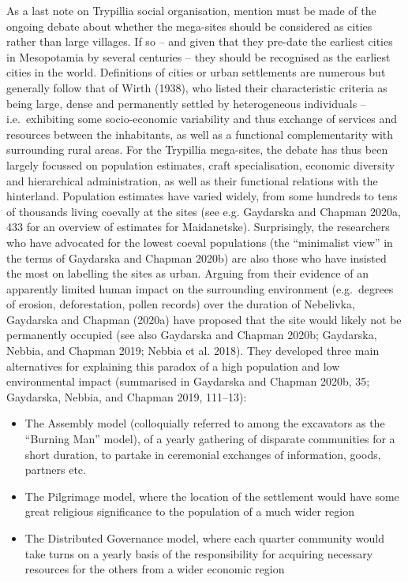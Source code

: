 \documentclass[
  12pt,
  a4paper, twoside]{book}
\providecommand{\tightlist}{%
  \setlength{\itemsep}{0pt}\setlength{\parskip}{0pt}}
\begin{document}
As a last note on Trypillia social organisation, mention must be made of the ongoing debate about whether the mega-sites should be considered as cities rather than large villages. If so -- and given that they pre-date the earliest cities in Mesopotamia by several centuries -- they should be recognised as the earliest cities in the world. Definitions of cities or urban settlements are numerous but generally follow that of Wirth (1938), who listed their characteristic criteria as being large, dense and permanently settled by heterogeneous individuals -- i.e.~exhibiting some socio-economic variability and thus exchange of services and resources between the inhabitants, as well as a functional complementarity with surrounding rural areas. For the Trypillia mega-sites, the debate has thus been largely focussed on population estimates, craft specialisation, economic diversity and hierarchical administration, as well as their functional relations with the hinterland. Population estimates have varied widely, from some hundreds to tens of thousands living coevally at the sites (see e.g. Gaydarska and Chapman 2020a, 433 for an overview of estimates for Maidanetske). Surprisingly, the researchers who have advocated for the lowest coeval populations (the ``minimalist view'' in the terms of Gaydarska and Chapman 2020b) are also those who have insisted the most on labelling the sites as urban. Arguing from their evidence of an apparently limited human impact on the surrounding environment (e.g.~degrees of erosion, deforestation, pollen records) over the duration of Nebelivka, Gaydarska and Chapman (2020a) have proposed that the site would likely not be permanently occupied (see also Gaydarska and Chapman 2020b; Gaydarska, Nebbia, and Chapman 2019; Nebbia et al. 2018). They developed three main alternatives for explaining this paradox of a high population and low environmental impact (summarised in Gaydarska and Chapman 2020b, 35; Gaydarska, Nebbia, and Chapman 2019, 111--13):

\begin{itemize}
\tightlist
\item
  The Assembly model (colloquially referred to among the excavators as the ``Burning Man'' model), of a yearly gathering of disparate communities for a short duration, to partake in ceremonial exchanges of information, goods, partners etc.
\item
  The Pilgrimage model, where the location of the settlement would have some great religious significance to the population of a much wider region
\item
  The Distributed Governance model, where each quarter community would take turns on a yearly basis of the responsibility for acquiring necessary resources for the others from a wider economic region
\end{itemize}
\end{document}
